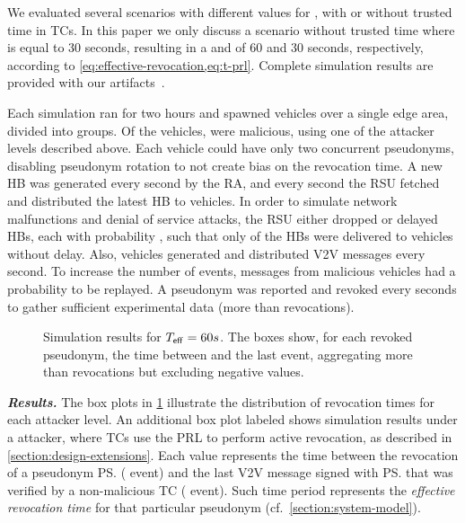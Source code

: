 We evaluated several scenarios with different values for \paramtt{}, with or
without trusted time in \acp{TC}. In this paper we only discuss a scenario
without trusted time where \paramtt{} is equal to 30 seconds, resulting in a
\paramteff{} and \paramtprl{} of 60 and 30 seconds, respectively, according to
\cref{eq:effective-revocation,eq:t-prl}. Complete simulation results are
provided with our artifacts~\cite{supplMaterial}.

Each simulation ran for two hours and spawned \simvehicles{} vehicles over a
single edge area, divided into \simgroups{} groups. Of the vehicles,
\simattackers{} were malicious, using one of the attacker levels described
above. Each vehicle could have only two concurrent pseudonyms, disabling
pseudonym rotation to not create bias on the revocation time. A new \ac{HB} was
generated every second by the \ac{RA}, and every second the \ac{RSU} fetched and
distributed the latest \ac{HB} to vehicles. In order to simulate network
malfunctions and denial of service attacks, the \ac{RSU} either dropped or
delayed \acp{HB}, 
each with probability \simdroprate, such that only \simcorrectrate{} of the
\acp{HB} were delivered to vehicles without delay. Also, vehicles generated and
distributed \ac{V2V} messages every second. To increase the number of
\funcverify{} events, messages from malicious vehicles had a \simreplayrate{}
probability to be replayed. A pseudonym was reported and revoked every
\simrevocationrate{} seconds to gather sufficient experimental data (more than
\simrevocations{} revocations).


\begin{figure}[t]
    \hspace*{-0.3cm}
    \resizebox{1.05\linewidth}{!} {
      
    } \caption{Simulation results for $\emph{$T_{\mathsf{eff}}$}{} = 60 s$. The boxes show, for
    each revoked pseudonym, the time between \funcrevokedaa{} and the last
    \funcverify{} event, aggregating more than \simrevocations{} revocations but
    excluding negative values.}
    \label{fig:eval-sim-base}
\end{figure}

\noindent\textbf{\emph{Results.}}
%
The box plots in \cref{fig:eval-sim-base} illustrate the distribution of
revocation times for each attacker level. An additional box plot labeled
\attackersmartprl{} shows simulation results under a \attackersmart{} attacker,
where \acp{TC} use the \ac{PRL} to perform active revocation, as described in
\cref{section:design-extensions}. Each value represents the time between the
revocation of a pseudonym \ps{} (\funcrevokedaa{} event) and the last \ac{V2V}
message signed with \ps{} that was verified by a non-malicious \ac{TC}
(\funcverify{} event). Such time period represents the \emph{effective
revocation time} for that particular pseudonym
(cf.~\cref{section:system-model}).

